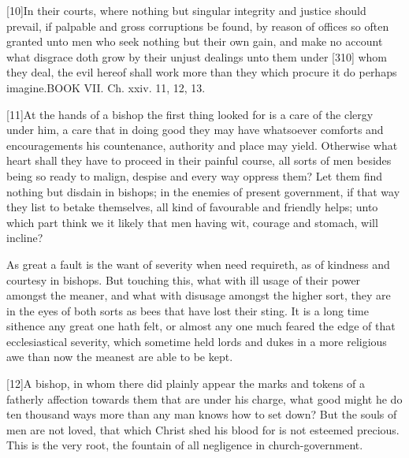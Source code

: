 [10]In their courts, where nothing but singular integrity and justice should prevail, if palpable and gross corruptions be found, by reason of offices so often granted unto men who seek nothing but their own gain, and make no account what disgrace doth grow by their unjust dealings unto them under [310] whom they deal, the evil hereof shall work more than they which procure it do perhaps imagine.BOOK VII. Ch. xxiv. 11, 12, 13.

[11]At the hands of a bishop the first thing looked for is a care of the clergy under him, a care that in doing good they may have whatsoever comforts and encouragements his countenance, authority and place may yield. Otherwise what heart shall they have to proceed in their painful course, all sorts of men besides being so ready to malign, despise and every way oppress them? Let them find nothing but disdain in bishops; in the enemies of present government, if that way they list to betake themselves, all kind of favourable and friendly helps; unto which part think we it likely that men having wit, courage and stomach, will incline?

As great a fault is the want of severity when need requireth, as of kindness and courtesy in bishops. But touching this, what with ill usage of their power amongst the meaner, and what with disusage amongst the higher sort, they are in the eyes of both sorts as bees that have lost their sting. It is a long time sithence any great one hath felt, or almost any one much feared the edge of that ecclesiastical severity, which sometime held lords and dukes in a more religious awe than now the meanest are able to be kept.

[12]A bishop, in whom there did plainly appear the marks and tokens of a fatherly affection towards them that are under his charge, what good might he do ten thousand ways more than any man knows how to set down? But the souls of men are not loved, that which Christ shed his blood for is not esteemed precious. This is the very root, the fountain of all negligence in church-government.

